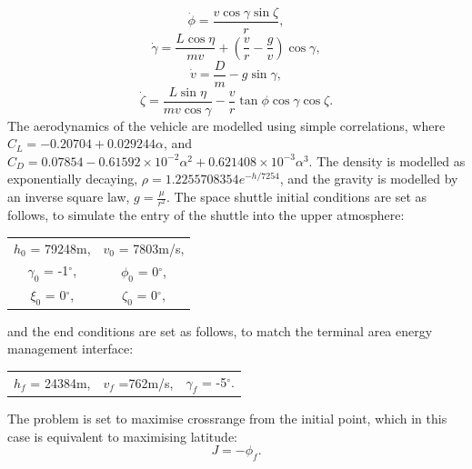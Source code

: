 \begin{equation}
\dot{\phi} = \frac{v\cos\gamma\sin\zeta}{r},
\end{equation}
\begin{equation}
\dot{\gamma} = \frac{L \cos\eta}{mv} + (\frac{v}{r}-\frac{g}{v})\cos\gamma,
\end{equation}
\begin{equation}
\dot{v} = \frac{D}{m}-g\sin\gamma,
\end{equation}
\begin{equation}
\dot{\zeta} = \frac{L  \sin\eta}{mv \cos \gamma}-\frac{v}{r}\tan\phi\cos\gamma\cos\zeta.
\end{equation}
The aerodynamics of the vehicle are modelled using simple correlations, where $C_L = -0.20704 + 0.029244\alpha$, and $C_D = 0.07854 -0.61592\times10^{-2}\alpha^2 + 0.621408\times10^{-3}\alpha^3$. The density is modelled as exponentially decaying, $\rho = 1.2255708354e^{-h/7254}$, and the gravity is modelled by an inverse square law, $g = \frac{\mu}{r^2}$.
The space shuttle initial conditions are set as follows\cite{Betts2009}, to simulate the entry of the shuttle into the upper atmosphere:
\begin{table}[H]
	\centering
\begin{tabular}{c c}
  $h_0$ =  79248m, & $v_0$ = 7803m/s, \\ 
  $\gamma_0$ =  -1$^\circ$, & $\phi_0$ =  0$^\circ$,\\ 
 $\xi_0$ =  0$^\circ$, & $\zeta_0$ =  0$^\circ$,\\ 
\end{tabular} 
\end{table}
\noindent
and the end conditions are set as follows\cite{Betts2009}, to match the terminal area energy management interface:
\begin{table}[H]
	\centering
	\begin{tabular}{ c c c}
		   $h_f$ =  24384m, &  $v_f$ =762m/s, & $\gamma_f$ =  -5$^\circ$.\\ 
	\end{tabular} 
\end{table}
\noindent
The problem is set to maximise crossrange from the initial point, which in this case is equivalent to maximising latitude:
\begin{equation}
J = -\phi_f.
\end{equation}

